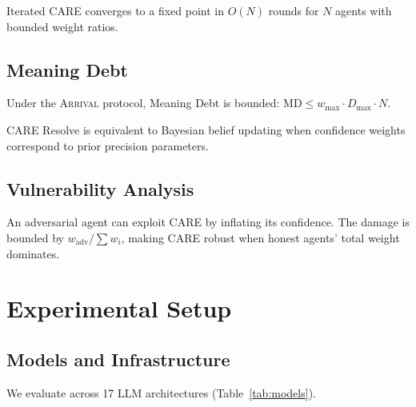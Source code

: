 \documentclass[11pt,a4paper]{article}
\newcommand{\arrival}{\textsc{Arrival}\xspace}
\begin{document}
\begin{theorembox}
Iterated CARE converges to a fixed point in $O(N)$ rounds for $N$
agents with bounded weight ratios.
\end{theorembox}

\subsection{Meaning Debt}

\begin{theorembox}
Under the \arrival protocol, Meaning Debt is bounded:
$\mathrm{MD} \leq w_{\max} \cdot D_{\max} \cdot N$.
\end{theorembox}

\begin{theorembox}
CARE Resolve is equivalent to Bayesian belief updating when confidence
weights correspond to prior precision parameters.
\end{theorembox}

\subsection{Vulnerability Analysis}

\begin{theorembox}
An adversarial agent can exploit CARE by inflating its confidence.
The damage is bounded by $w_{\mathrm{adv}} / \sum w_i$, making CARE
robust when honest agents' total weight dominates.
\end{theorembox}

\section{Experimental Setup}\label{sec:setup}

\subsection{Models and Infrastructure}

We evaluate across 17 LLM architectures (Table~\ref{tab:models}).
\end{document}
